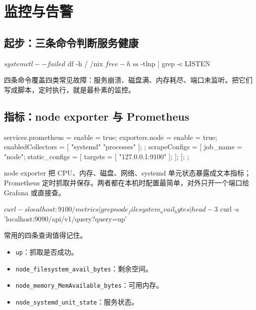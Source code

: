 \chapter{监控与告警}
\label{ch:monitoring}

\section{起步：三条命令判断服务健康}

\begin{shellsession}
$ systemctl --failed
$ df -h / /nix
$ free -h
$ ss -tlnp | grep -c LISTEN
\end{shellsession}

四条命令覆盖四类常见故障：服务崩溃、磁盘满、内存耗尽、端口未监听。把它们写成脚本，定时执行，就是最朴素的监控。

\section{指标：node exporter 与 Prometheus}

\begin{nixcode}
services.prometheus = {
  enable = true;
  exporters.node = {
    enable = true;
    enabledCollectors = [
      "systemd"
      "processes"
    ];
  };
  scrapeConfigs = [
    {
      job_name = "node";
      static_configs = [ { targets = [ "127.0.0.1:9100" ]; } ];
    }
  ];
};
\end{nixcode}

node exporter 把 CPU、内存、磁盘、网络、systemd 单元状态暴露成文本指标；Prometheus 定时抓取并保存。两者都在本机时配置最简单，对外只开一个端口给 Grafana 或直接查。

\begin{shellsession}
$ curl -s localhost:9100/metrics | grep node_filesystem_avail_bytes | head -3
$ curl -s 'localhost:9090/api/v1/query?query=up'
\end{shellsession}

常用的四条查询值得记住。

\begin{itemize}
  \item \texttt{up}：抓取是否成功。
  \item \texttt{node\_filesystem\_avail\_bytes}：剩余空间。
  \item \texttt{node\_memory\_MemAvailable\_bytes}：可用内存。
  \item \texttt{node\_systemd\_unit\_state}：服务状态。
\end{itemize}

